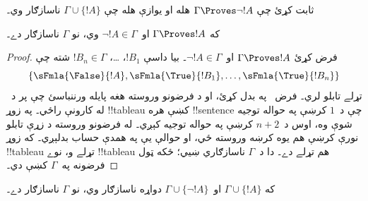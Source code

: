 \documentclass[../../../include/open-logic-section]{subfiles}
\begin{document}
\begin{prob}
ثابت کړئ چې $\Gamma \Proves \lnot !A$ هله او يوازې هله چې
$\Gamma \cup \{!A\}$ ناسازګار وي۔
\end{prob}

\begin{prop}
  که $\Gamma \Proves !A$ او~$\lnot !A \in \Gamma$ وي، نو
  $\Gamma$ ناسازګار دے۔
\end{prop}

\begin{proof}
  فرض کړئ $\Gamma \Proves !A$ او~$\lnot !A \in \Gamma$۔ بيا داسې
  $!B_1$، \dots، $!B_n \in \Gamma$ شته چې
  \[
  \{\sFmla{\False}{!A}, \sFmla{\True}{!B_1}, \dots, \sFmla{\True}{!B_n}\}
  \]
  تړلے تابلو لري۔ فرض~ په
   بدل کړئ، او د فرضونو وروسته هغه
   پايله ورننباسئ چې پر
   د~\TRule{\True}{\lnot} له کارونې
  راځي۔ په زوړ !!{tableau} کښې هره !!{sentence} چې د~$1$ کرښې په
  حواله توجيه شوې وه، اوس د~$n+2$ کرښې په حواله توجيه کېږي۔ له فرضونو وروسته د زړې
  تابلو نورې کرښې هم يوه کرښه وروسته ځي، او حوالې يې په همدې حساب
  بدلېږي۔ که
  زوړ !!{tableau} تړلے و، نوے !!{tableau} هم تړلے دے۔ دا د~$\Gamma$ ناسازګاري
  ښيي؛ ځکه ټول فرضونه په~$\Gamma$ کښې دي۔
\end{proof}

\begin{prop}
  که $\Gamma \cup \{!A\}$ او~$\Gamma \cup \{\lnot !A\}$ دواړه
  ناسازګار وي، نو $\Gamma$ ناسازګار دے۔
\end{prop}
\end{document}
